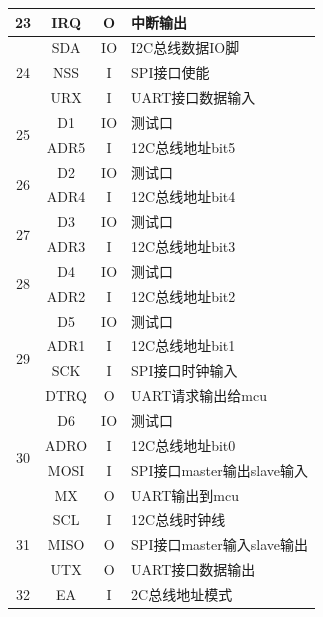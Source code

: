 \documentclass[a4paper]{ctexart}
\begin{document}
\begin{spacing}{1.5}
\begin{appendices}
\begin{table}[htbp]
\begin{tabular}{|c|c|c|l|}
		\hline
		23    & IRQ   & O     & 中断输出 \\
		\hline
		\multirow{3}{*}{24}    & SDA   & IO    & I2C总线数据IO脚 \\
		\cline{2-4}
		& NSS   & I     & SPI接口使能 \\
		\cline{2-4}
		& URX   & I     & UART接口数据输入 \\
		\hline
		\multirow{2}{*}{25}& D1    & IO    & 测试口 \\
		\cline{2-4}
		          & ADR5  & I     & 12C总线地址bit5 \\
		\hline
		\multirow{2}{*}{26}    & D2    & IO    & 测试口 \\
		\cline{2-4}
		          & ADR4  & I     & 12C总线地址bit4 \\
		\hline
		\multirow{2}{*}{27}& D3    & IO    & 测试口 \\
		\cline{2-4}
		          & ADR3  & I     & 12C总线地址bit3 \\
		\hline
		\multirow{2}{*}{28}& D4    & IO    & 测试口 \\
		\cline{2-4}
		          & ADR2  & I     & 12C总线地址bit2 \\
		\hline
		\multirow{4}{*}{29}& D5    & IO    & 测试口 \\
		\cline{2-4}
		          & ADR1  & I     & 12C总线地址bit1 \\
		\cline{2-4}
		          & SCK   & I     & SPI接口时钟输入 \\
		\cline{2-4}
		          & DTRQ  & O     & UART请求输出给mcu \\
		\hline
		\multirow{4}{*}{30}& D6    & IO    & 测试口 \\
		\cline{2-4}
		          & ADRO  & I     & 12C总线地址bit0 \\
		\cline{2-4}
		          & MOSI  & I     & SPI接口master输出slave输入 \\
		\cline{2-4}
		          & MX    & O     & UART输出到mcu \\
		\hline
		\multirow{3}{*}{31}& SCL   & I     & 12C总线时钟线 \\
		\cline{2-4}
		          & MISO  & O     & SPI接口master输入slave输出 \\
		\cline{2-4}
		          & UTX   & O     & UART接口数据输出 \\
		\hline
		32    & EA    & I     & 2C总线地址模式 \\
		\hline
	\end{tabular}
\end{table}
\end{appendices}
\end{spacing}
\end{document}
